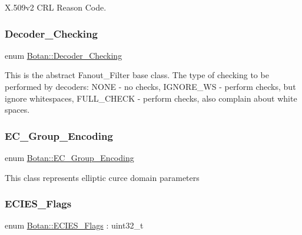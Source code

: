 X.\+509v2 C\+RL Reason Code. \mbox{\label{namespace_botan_acd5baf937a9984c39f8b44104dde76ae}} 
\subsubsection{\texorpdfstring{Decoder\+\_\+\+Checking}{Decoder\_Checking}}
{\footnotesize\ttfamily enum \hyperlink{namespace_botan_acd5baf937a9984c39f8b44104dde76ae}{Botan\+::\+Decoder\+\_\+\+Checking}}

This is the abstract Fanout\+\_\+\+Filter base class. The type of checking to be performed by decoders\+: N\+O\+NE -\/ no checks, I\+G\+N\+O\+R\+E\+\_\+\+WS -\/ perform checks, but ignore whitespaces, F\+U\+L\+L\+\_\+\+C\+H\+E\+CK -\/ perform checks, also complain about white spaces. \mbox{\label{namespace_botan_ad0ee6307c8f311388a2bc00426a7f858}} 
\subsubsection{\texorpdfstring{E\+C\+\_\+\+Group\+\_\+\+Encoding}{EC\_Group\_Encoding}}
{\footnotesize\ttfamily enum \hyperlink{namespace_botan_ad0ee6307c8f311388a2bc00426a7f858}{Botan\+::\+E\+C\+\_\+\+Group\+\_\+\+Encoding}}

This class represents elliptic curce domain parameters \mbox{\label{namespace_botan_a9633493dccb5f879eeafafe99c71f6e8}} 
\subsubsection{\texorpdfstring{E\+C\+I\+E\+S\+\_\+\+Flags}{ECIES\_Flags}}
{\footnotesize\ttfamily enum \hyperlink{namespace_botan_a9633493dccb5f879eeafafe99c71f6e8}{Botan\+::\+E\+C\+I\+E\+S\+\_\+\+Flags} \+: uint32\+\_\+t\hspace{0.3cm}{\ttfamily [strong]}}

